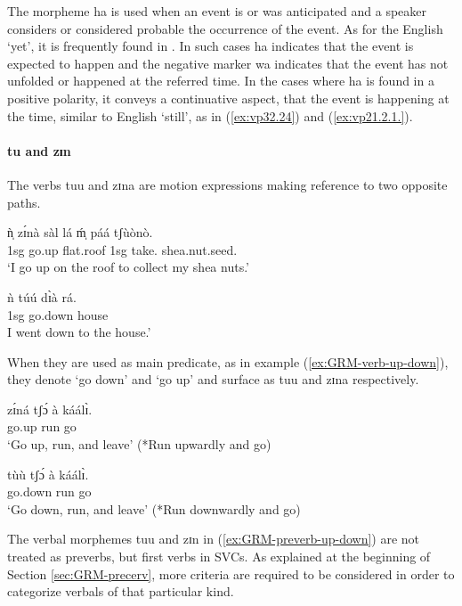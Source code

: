\begin{exe}
\begin{exe}
\begin{exe}
\begin{exe}
\begin{exe}
\begin{exe}
\begin{exe}
\begin{exe}
\begin{exe}
\begin{exe}
\begin{exe}
\begin{exe}
\z 
 \z
 
The morpheme {\sls ha}  is used when an event is or was anticipated and a speaker considers or considered probable the 
occurrence of the event. As  for the English `yet', it is frequently found in . In 
such cases  {\sls ha} indicates that the event is expected to happen and the negative 
marker {\sls wa} indicates that the event has not unfolded or happened at the referred time. In the 
cases where {\sls ha} is found in a positive polarity,  it  conveys a continuative aspect, that the event is happening at the time, similar to English `still',  as in (\ref{ex:vp32.24}) and (\ref{ex:vp21.2.1.}). 



\paragraph{tu and zɪn}
\label{sec:GRM-preverb-up-down} 

The verbs {\sls tuu} and {\sls zɪna} are motion
expressions making reference to two opposite paths. 


\ea\label{ex:GRM-verb-up-down}
\ea
\gll ǹ̩ zɪ́nà sàl lá ḿ̩ páá tʃùònò.\\
{\sc 1sg} go.up flat.roof {\foc} {\sc 1sg} take.{\pv} shea.nut.seed.{\pl}\\
\glt  `I go up on the roof to collect my shea nuts.'

\ex
\gll ǹ túú dɪ̀à rá.\\
{\sc 1sg} go.down house {\foc}\\
\glt I went down to the house.'
\z 
 \z

When they are used as main
predicate, as in example (\ref{ex:GRM-verb-up-down}),  they denote `go down' and
`go up' and  surface as {\sls tuu} and {\sls zɪna} respectively. 




\ea\label{ex:GRM-preverb-up-down}
\ea\label{ex:GRM-preverb-up}
\gll zɪ́ná tʃɔ́  à káálɪ̀.\\
   {go.up} run {\conn} go\\
\glt  `Go up,  run, and leave'  (*Run upwardly and go)

\ex\label{ex:GRM-preverb-down}
\gll tùù tʃɔ́  à káálɪ̀.\\
   {go.down} run {\conn} go\\
\glt  `Go down, run, and leave'  (*Run downwardly and go)

\z 
 \z
 
The verbal morphemes {\sls tuu} and {\sls zɪn} in 
(\ref{ex:GRM-preverb-up-down}) 
are not treated as preverbs, but first verbs in SVCs.  As explained at the beginning of  Section \ref{sec:GRM-precerv}, more criteria are required to be considered in order to categorize verbals  of that particular kind.



\end{exe}
\end{exe}
\end{exe}
\end{exe}
\end{exe}
\end{exe}
\end{exe}
\end{exe}
\end{exe}
\end{exe}
\end{exe}
\end{exe}
